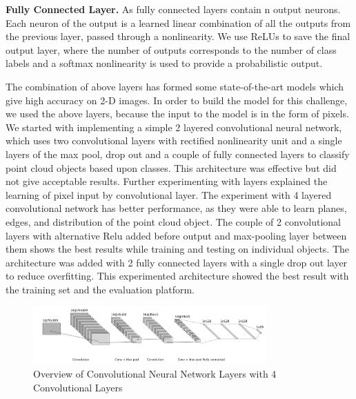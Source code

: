 \textbf{Fully Connected Layer.}
As fully connected layers contain n output neurons. Each neuron of the output is a learned linear
combination of all the outputs from the previous layer, passed through a nonlinearity.
We use ReLUs to save the final output layer, where the number of outputs corresponds
to the number of class labels and a softmax nonlinearity is used to provide a probabilistic output.



The combination of above layers has formed some state-of-the-art models which give high accuracy on 2-D images.
In order to build the model for this challenge, we used the above layers, because the input to the model is in the form of pixels.
We started with implementing a simple 2 layered
convolutional neural network, which uses two convolutional layers with rectified nonlinearity unit and a single layers of 
the max pool, drop out and a couple of 
fully connected layers to classify point cloud objects based upon classes. This architecture was effective but did not give acceptable 
results. Further experimenting with layers explained the learning of pixel input by convolutional layer.
The experiment with 4 layered convolutional network has better performance, as they were able to learn planes, edges, 
and distribution of the point cloud object. The couple of 2 convolutional layers with alternative Relu added before output and max-pooling 
layer between them shows the
best results while training and testing on individual objects. The architecture was added with 2 fully connected layers with a single 
drop out layer to reduce overfitting.
This experimented architecture showed the best result with the training set and the evaluation platform.

\begin{figure}[!h]
     \begin{center}
       \includegraphics[width=0.8\textwidth]{./images/object_net.pdf}
       \caption{Overview of Convolutional Neural Network Layers with 4 Convolutional Layers}
       \label{fig:cnn}
     \end{center}
\end{figure}

